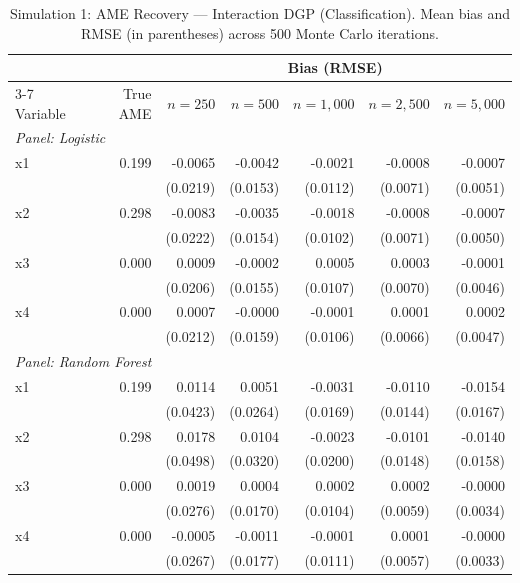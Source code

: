 \documentclass[12pt,a4paper]{article}
\numberwithin{equation}{section}
\theoremstyle{plain}
\theoremstyle{definition}
\begin{document}
	\begin{table}[htbp]
		\centering
		\small
		\begin{threeparttable}
			\caption{Simulation 1: AME Recovery --- Interaction DGP (Classification). Mean bias and RMSE (in parentheses) across 500 Monte Carlo iterations.}
			\label{tab:sim1_classification_interaction}
			\begin{tabular}{lrrrrrr}
				\toprule
				& & \multicolumn{5}{c}{Bias (RMSE)} \\
				\cmidrule(lr){3-7}
				Variable & True AME & $n=250$ & $n=500$ & $n=1,000$ & $n=2,500$ & $n=5,000$ \\
				\midrule
				\multicolumn{7}{l}{\textit{Panel: Logistic}} \\
				\quad x1 & 0.199 & -0.0065 & -0.0042 & -0.0021 & -0.0008 & -0.0007 \\
				&  & (0.0219) & (0.0153) & (0.0112) & (0.0071) & (0.0051) \\
				\quad x2 & 0.298 & -0.0083 & -0.0035 & -0.0018 & -0.0008 & -0.0007 \\
				&  & (0.0222) & (0.0154) & (0.0102) & (0.0071) & (0.0050) \\
				\quad x3 & 0.000 & 0.0009 & -0.0002 & 0.0005 & 0.0003 & -0.0001 \\
				&  & (0.0206) & (0.0155) & (0.0107) & (0.0070) & (0.0046) \\
				\quad x4 & 0.000 & 0.0007 & -0.0000 & -0.0001 & 0.0001 & 0.0002 \\
				&  & (0.0212) & (0.0159) & (0.0106) & (0.0066) & (0.0047) \\
				\midrule
				\multicolumn{7}{l}{\textit{Panel: Random Forest}} \\
				\quad x1 & 0.199 & 0.0114 & 0.0051 & -0.0031 & -0.0110 & -0.0154 \\
				&  & (0.0423) & (0.0264) & (0.0169) & (0.0144) & (0.0167) \\
				\quad x2 & 0.298 & 0.0178 & 0.0104 & -0.0023 & -0.0101 & -0.0140 \\
				&  & (0.0498) & (0.0320) & (0.0200) & (0.0148) & (0.0158) \\
				\quad x3 & 0.000 & 0.0019 & 0.0004 & 0.0002 & 0.0002 & -0.0000 \\
				&  & (0.0276) & (0.0170) & (0.0104) & (0.0059) & (0.0034) \\
				\quad x4 & 0.000 & -0.0005 & -0.0011 & -0.0001 & 0.0001 & -0.0000 \\
				&  & (0.0267) & (0.0177) & (0.0111) & (0.0057) & (0.0033) \\

\end{tabular}
\end{threeparttable}
\end{table}
\end{document}

